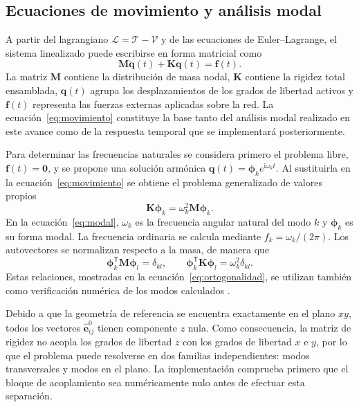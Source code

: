 \documentclass[11pt,letterpaper]{article}
\begin{document}
\subsection{Ecuaciones de movimiento y análisis modal}

A partir del lagrangiano $\mathcal{L}=\mathcal{T}-\mathcal{V}$ y de las ecuaciones de Euler--Lagrange, el sistema linealizado puede escribirse en forma matricial como
\begin{equation}
\mathbf M\ddot{\mathbf q}(t)+\mathbf K\mathbf q(t)=\mathbf f(t).
\label{eq:movimiento}
\end{equation}
La matriz $\mathbf M$ contiene la distribución de masa nodal, $\mathbf K$ contiene la rigidez total ensamblada, $\mathbf q(t)$ agrupa los desplazamientos de los grados de libertad activos y $\mathbf f(t)$ representa las fuerzas externas aplicadas sobre la red. La ecuación~\eqref{eq:movimiento} constituye la base tanto del análisis modal realizado en este avance como de la respuesta temporal que se implementará posteriormente.

Para determinar las frecuencias naturales se considera primero el problema libre, $\mathbf f(t)=\mathbf 0$, y se propone una solución armónica $\mathbf q(t)=\boldsymbol{\phi}_k e^{\mathrm{i}\omega_k t}$. Al sustituirla en la ecuación~\eqref{eq:movimiento} se obtiene el problema generalizado de valores propios
\begin{equation}
\mathbf K\boldsymbol{\phi}_k=\omega_k^2\mathbf M\boldsymbol{\phi}_k.
\label{eq:modal}
\end{equation}
En la ecuación~\eqref{eq:modal}, $\omega_k$ es la frecuencia angular natural del modo $k$ y $\boldsymbol{\phi}_k$ es su forma modal. La frecuencia ordinaria se calcula mediante $f_k=\omega_k/(2\pi)$. Los autovectores se normalizan respecto a la masa, de manera que
\begin{equation}
\boldsymbol{\phi}_k^{\mathsf T}\mathbf M\boldsymbol{\phi}_l=\delta_{kl},
\qquad
\boldsymbol{\phi}_k^{\mathsf T}\mathbf K\boldsymbol{\phi}_l=\omega_k^2\delta_{kl}.
\label{eq:ortogonalidad}
\end{equation}
Estas relaciones, mostradas en la ecuación~\eqref{eq:ortogonalidad}, se utilizan también como verificación numérica de los modos calculados \cite{inman2014,ewins2000}.

Debido a que la geometría de referencia se encuentra exactamente en el plano $xy$, todos los vectores $\hat{\mathbf e}_{ij}^{0}$ tienen componente $z$ nula. Como consecuencia, la matriz de rigidez no acopla los grados de libertad $z$ con los grados de libertad $x$ e $y$, por lo que el problema puede resolverse en dos familias independientes: modos transversales y modos en el plano. La implementación comprueba primero que el bloque de acoplamiento sea numéricamente nulo antes de efectuar esta separación.
\end{document}
